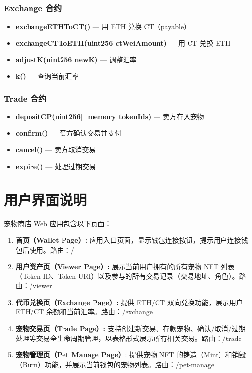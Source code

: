 \documentclass{mancls}
\begin{document}
\subsubsection{Exchange 合约}
\begin{itemize}
	\item \textbf{exchangeETHToCT()} — 用 ETH 兑换 CT（payable）
	\item \textbf{exchangeCTToETH(uint256 ctWeiAmount)} — 用 CT 兑换 ETH
	\item \textbf{adjustK(uint256 newK)} — 调整汇率
	\item \textbf{k()} — 查询当前汇率
\end{itemize}

\subsubsection{Trade 合约}
\begin{itemize}
	\item \textbf{depositCP(uint256[] memory tokenIds)} — 卖方存入宠物
	\item \textbf{confirm()} — 买方确认交易并支付
	\item \textbf{cancel()} — 卖方取消交易
	\item \textbf{expire()} — 处理过期交易
\end{itemize}

\section{用户界面说明}

宠物商店 Web 应用包含以下页面：

\begin{enumerate}
	\item \textbf{首页（Wallet Page）:} 应用入口页面，显示钱包连接按钮，提示用户连接钱包后使用。路由：/
	\item \textbf{用户资产页（Viewer Page）:} 展示当前用户拥有的所有宠物 NFT 列表（Token ID、Token URI）以及参与的所有交易记录（交易地址、角色）。路由：/viewer
	\item \textbf{代币兑换页（Exchange Page）:} 提供 ETH/CT 双向兑换功能，展示用户 ETH/CT 余额和当前汇率。路由：/exchange
	\item \textbf{宠物交易页（Trade Page）:} 支持创建新交易、存款宠物、确认/取消/过期处理等交易全生命周期管理，以表格形式展示所有相关交易。路由：/trade
	\item \textbf{宠物管理页（Pet Manage Page）:} 提供宠物 NFT 的铸造（Mint）和销毁（Burn）功能，并展示当前钱包的宠物列表。路由：/pet-manage
\end{enumerate}
\end{document}

